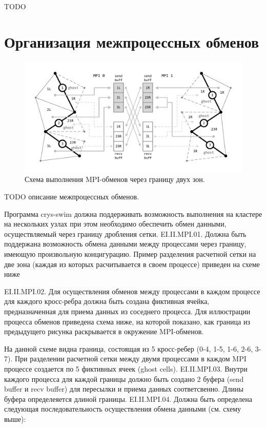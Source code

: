 \documentclass[
11pt,%
tightenlines,%
twoside,%
onecolumn,%
nofloats,%
nobibnotes,%
nofootinbib,%
superscriptaddress,%
noshowpacs,%
centertags]%
{revtex4}
\begin{document}
TODO

\section{Организация межпроцессных обменов}

\begin{figure}[h]
\includegraphics[width=1.0\textwidth]{pics/04-MPI.pdf}
\caption{Схема выполнения MPI-обменов через границу двух зон.}\label{fig:04-MPI}
\end{figure}

TODO описание межпроцессных обменов.

Программа crys-swim должна поддерживать возможность выполнения на кластере на нескольких узлах при этом необходимо обеспечить обмен данными, осуществляемый через границу дробления сетки.
 EI.II.MPI.01. Должна быть поддержана возможность обмена данными между процессами через границу, имеющую произвольную концигурацию. Пример разделения расчетной сетки на две зона (каждая из которых расчитывается в своем процессе) приведен на схеме ниже

EI.II.MPI.02. Для осуществления обменов между процессами в каждом процессе для каждого кросс-ребра должна быть создана фиктивная ячейка, предназначенная для приема данных из соседнего процесса.
Для иллюстрации процесса обменов приведена схема ниже, на которой показано, как граница из предыдущего рисунка раскрывается в окружение MPI-обменов.

На данной схеме видна граница, состоящая из 5 кросс-ребер (0-4, 1-5, 1-6, 2-6, 3-7). При разделении расчетной сетки между двумя процессами в каждом MPI процессе создается по 5 фиктивных ячеек (ghost cells).
 EI.II.MPI.03. Внутри каждого процесса для каждой границы должно быть создано 2 буфера (send buffer и recv buffer) для пересылки и приема данных соответсвенно. Длины буфера определеяется длиной границы.
 EI.II.MPI.04. Должна быть определена следующая последовательность осуществления обмена данными (см. схему выше):
\end{document}
